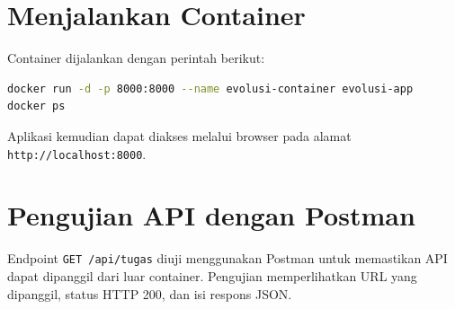 \documentclass[a4paper,oneside,11pt]{book}
\begin{document}



\section{Menjalankan Container}

Container dijalankan dengan perintah berikut:

\begin{lstlisting}[language=bash, caption={Menjalankan container Docker}]
docker run -d -p 8000:8000 --name evolusi-container evolusi-app
docker ps
\end{lstlisting}

Aplikasi kemudian dapat diakses melalui browser pada alamat \texttt{http://localhost:8000}.


\section{Pengujian API dengan Postman}

Endpoint \texttt{GET /api/tugas} diuji menggunakan Postman untuk memastikan API dapat dipanggil dari luar container. Pengujian memperlihatkan URL yang dipanggil, status HTTP 200, dan isi respons JSON.
\end{document}
